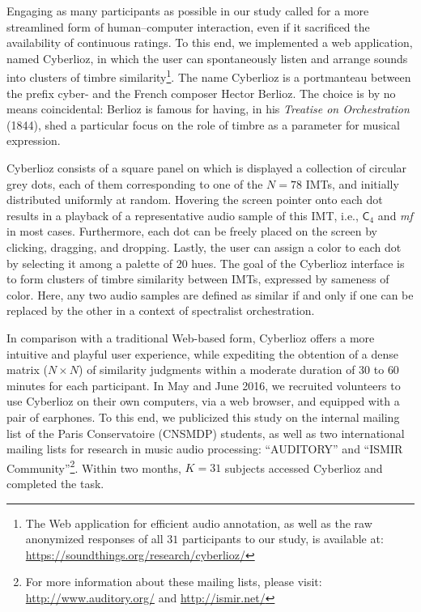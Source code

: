 \documentclass{bmcart}
\makeatletter
\newcommand*{\ie}{i.e.,\@\xspace}
\makeatother
\begin{document}
Engaging as many participants as possible in our study called for a more streamlined form of human--computer interaction, even if it sacrificed the availability of continuous ratings.
To this end, we implemented a web application, named Cyberlioz, in which the user can spontaneously listen and arrange sounds into clusters of timbre similarity\footnote{The Web application for efficient audio annotation, as well as the raw anonymized responses of all $31$ participants to our study, is available at: \url{https://soundthings.org/research/cyberlioz/}}.
The name Cyberlioz is a portmanteau between the prefix cyber- and the French composer Hector Berlioz.
The choice is by no means coincidental: Berlioz is famous for having, in his \emph{Treatise on Orchestration} (1844), shed a particular focus on the role of timbre as a parameter for musical expression.


Cyberlioz consists of a square panel on which is displayed a collection of circular grey dots, each of them corresponding to one of the $N=78$ IMTs, and initially distributed uniformly at random.
Hovering the screen pointer onto each dot results in a playback of a representative audio sample of this IMT, \ie{} $\textsf{C}_4$ and \emph{mf} in most cases. Furthermore, each dot can be freely placed on the screen by clicking, dragging, and dropping.
Lastly, the user can assign a color to each dot by selecting it among a palette of 20 hues.
The goal of the Cyberlioz interface is to form clusters of timbre similarity between IMTs, expressed by sameness of color.
Here, any two audio samples are defined as similar if and only if one can be replaced by the other in a context of spectralist orchestration.

In comparison with a traditional Web-based form, Cyberlioz offers a more intuitive and playful user experience, while expediting the obtention of a dense matrix ($N\times N$) of similarity judgments within a moderate duration of $30$ to $60$ minutes for each participant.
In May and June 2016, we recruited volunteers to use Cyberlioz on their own computers, via a web browser, and equipped with a pair of earphones.
To this end, we publicized this study on the internal mailing list of the Paris Conservatoire (CNSMDP) students, as well as two international mailing lists for research in music audio processing: ``AUDITORY''  and ``ISMIR Community''\footnote{
For more information about these mailing lists, please visit:
\url{http://www.auditory.org/} and \url{http://ismir.net/}}.
Within two months, $K=31$ subjects accessed Cyberlioz and completed the task.%
\end{document}
